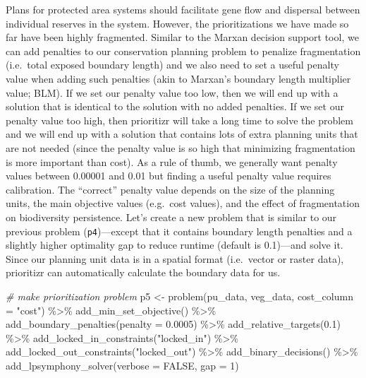\documentclass[
  12pt,
]{book}
\newenvironment{Shaded}{\begin{snugshade}}{\end{snugshade}}
\newcommand{\AttributeTok}[1]{\textcolor[rgb]{0.77,0.63,0.00}{#1}}
\newcommand{\CommentTok}[1]{\textcolor[rgb]{0.56,0.35,0.01}{\textit{#1}}}
\newcommand{\ConstantTok}[1]{\textcolor[rgb]{0.00,0.00,0.00}{#1}}
\newcommand{\DecValTok}[1]{\textcolor[rgb]{0.00,0.00,0.81}{#1}}
\newcommand{\FloatTok}[1]{\textcolor[rgb]{0.00,0.00,0.81}{#1}}
\newcommand{\FunctionTok}[1]{\textcolor[rgb]{0.00,0.00,0.00}{#1}}
\newcommand{\NormalTok}[1]{#1}
\newcommand{\OtherTok}[1]{\textcolor[rgb]{0.56,0.35,0.01}{#1}}
\newcommand{\SpecialCharTok}[1]{\textcolor[rgb]{0.00,0.00,0.00}{#1}}
\newcommand{\StringTok}[1]{\textcolor[rgb]{0.31,0.60,0.02}{#1}}
\begin{document}
Plans for protected area systems should facilitate gene flow and dispersal between individual reserves in the system. However, the prioritizations we have made so far have been highly fragmented. Similar to the Marxan decision support tool, we can add penalties to our conservation planning problem to penalize fragmentation (i.e.~total exposed boundary length) and we also need to set a useful penalty value when adding such penalties (akin to Marxan's boundary length multiplier value; BLM). If we set our penalty value too low, then we will end up with a solution that is identical to the solution with no added penalties. If we set our penalty value too high, then prioritizr will take a long time to solve the problem and we will end up with a solution that contains lots of extra planning units that are not needed (since the penalty value is so high that minimizing fragmentation is more important than cost). As a rule of thumb, we generally want penalty values between 0.00001 and 0.01 but finding a useful penalty value requires calibration. The ``correct'' penalty value depends on the size of the planning units, the main objective values (e.g.~cost values), and the effect of fragmentation on biodiversity persistence. Let's create a new problem that is similar to our previous problem (\texttt{p4})---except that it contains boundary length penalties and a slightly higher optimality gap to reduce runtime (default is 0.1)---and solve it. Since our planning unit data is in a spatial format (i.e.~vector or raster data), prioritizr can automatically calculate the boundary data for us.

\clearpage

\begin{Shaded}
\begin{Highlighting}[]
\CommentTok{\# make prioritization problem}
\NormalTok{p5 }\OtherTok{\textless{}{-}} \FunctionTok{problem}\NormalTok{(pu\_data, veg\_data, }\AttributeTok{cost\_column =} \StringTok{"cost"}\NormalTok{) }\SpecialCharTok{\%\textgreater{}\%}
      \FunctionTok{add\_min\_set\_objective}\NormalTok{() }\SpecialCharTok{\%\textgreater{}\%}
      \FunctionTok{add\_boundary\_penalties}\NormalTok{(}\AttributeTok{penalty =} \FloatTok{0.0005}\NormalTok{) }\SpecialCharTok{\%\textgreater{}\%}
      \FunctionTok{add\_relative\_targets}\NormalTok{(}\FloatTok{0.1}\NormalTok{) }\SpecialCharTok{\%\textgreater{}\%}
      \FunctionTok{add\_locked\_in\_constraints}\NormalTok{(}\StringTok{"locked\_in"}\NormalTok{) }\SpecialCharTok{\%\textgreater{}\%}
      \FunctionTok{add\_locked\_out\_constraints}\NormalTok{(}\StringTok{"locked\_out"}\NormalTok{) }\SpecialCharTok{\%\textgreater{}\%}
      \FunctionTok{add\_binary\_decisions}\NormalTok{() }\SpecialCharTok{\%\textgreater{}\%}
      \FunctionTok{add\_lpsymphony\_solver}\NormalTok{(}\AttributeTok{verbose =} \ConstantTok{FALSE}\NormalTok{, }\AttributeTok{gap =} \DecValTok{1}\NormalTok{)}
\end{Highlighting}
\end{Shaded}
\end{document}
